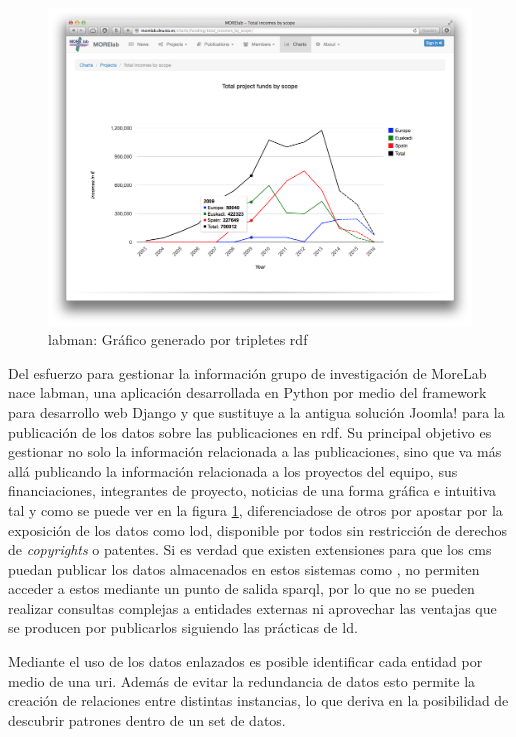\begin{figure}[!htp]
	\centering
	\includegraphics[scale=0.21]{fig/labman-chart}
	\caption{\acrshort{labman}: Gráfico generado por tripletes \acrshort{rdf}}\label{fig:labmanchart}
\end{figure}

Del esfuerzo para gestionar la información grupo de investigación de MoreLab nace \acrshort{labman}, una aplicación desarrollada en Python\cite{Python} por medio del framework para desarrollo web Django\cite{Django} y que sustituye a la antigua solución Joomla! para la publicación de los datos sobre las publicaciones en \acrfull{rdf}\cite{RDF}. Su principal objetivo es gestionar no solo la información relacionada a las publicaciones, sino que va más allá publicando la información relacionada a los proyectos del equipo, sus financiaciones, integrantes de proyecto, noticias de una forma gráfica e intuitiva tal y como se puede ver en la figura \ref{fig:labmanchart}, diferenciadose de otros  por apostar por la exposición de los datos como \acrlong{lod}\cite{linkeddata}, disponible por todos sin restricción de derechos de \textit{copyrights} o patentes. Si es verdad que existen extensiones para que los \acrshort{cms} puedan publicar los datos almacenados en estos sistemas como , no permiten acceder a estos mediante un punto de salida \acrshort{sparql}, por lo que no se pueden realizar consultas complejas a entidades externas ni aprovechar las ventajas que se producen por publicarlos siguiendo las prácticas de \acrshort{ld}.

Mediante el uso de los datos enlazados es posible identificar cada entidad por medio de una \acrshort{uri}. Además de evitar la redundancia de datos esto permite la creación de relaciones entre distintas instancias, lo que deriva en la posibilidad de descubrir patrones dentro de un set de datos.\cite{pena_visual_2014}